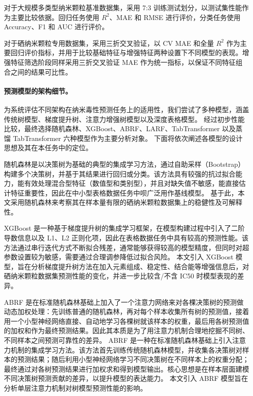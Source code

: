 对于大规模多类型纳米颗粒基准数据集，采用 7:3 训练测试划分，以测试集性能作为主要比较依据。回归任务使用 $R^2$、MAE 和 RMSE 进行评价，分类任务使用 Accuracy、F1 和 AUC 进行评价。

对于硒纳米颗粒专用数据集，采用三折交叉验证，以 CV MAE 和全量 $R^2$ 作为主要回归评价指标，并用于比较基础特征与增强特征两种设置下不同模型的表现。增强特征筛选阶段同样采用三折交叉验证 MAE 作为统一指标，以保证不同特征组合之间的结果可比性。

\paragraph{预测模型的架构细节。}
为系统评估不同架构在纳米毒性预测任务上的适用性，我们尝试了多种模型，涵盖传统树模型、梯度提升树、注意力增强树模型以及深度表格模型。
经过初步性能比较，最终选择随机森林、XGBoost、ABRF、LARF、TabTransformer 以及蒸馏 TabTransformer 六种模型作为主要分析对象。
下面将依次阐述各模型的设计思想及其在本任务中的定位。

随机森林是以决策树为基础的典型的集成学习方法，通过自助采样（Bootstrap）构建多个决策树，并基于其结果进行回归或分类。该方法具有较强的抗过拟合能力，能有效处理混合型特征（数值型和类别型），并且对缺失值不敏感，能直接估计特征重要性，因此在中小型表格数据任务中呗广泛用作基线模型。
基于此，本文采用随机森林来考察其在样本量有限的硒纳米颗粒数据集上的稳健性及可解释性。


XGBoost 是一种基于梯度提升树的集成学习框架，在模型构建过程中引入了二阶导数信息以及 L1、L2 正则化项，因此在表格数据任务中具有较高的预测性能。该方法通过串行迭代方式不断拟合残差，通常能够获得较高的模型精度，但同时对超参数设置较为敏感，需要通过合理调参降低过拟合风险。
本文引入 XGBoost 模型，旨在分析梯度提升树方法在加入元素组成、稳定性、结合能等增强信息后，对硒纳米颗粒数据集预测性能的变化，并进一步比较含/不含 IC50 时模型表现的差异。

ABRF 是在标准随机森林基础上加入了一个注意力网络来对各棵决策树的预测做动态加权处理：先训练普通的随机森林，再对每个样本收集所有树的预测值，接着用一个小型神经网络直接、自动地学习各棵树就该样本的权重，最后用各树预测值的加权和作为最终预测结果。因此其本质是为了用注意力机制合理地挖掘不同树、不同样本之间预测可靠性的差异。
ABRF 是一种在标准随机森林基础上引入注意力机制的集成学习方法。该方法首先训练传统随机森林模型，并收集各决策树对样本的预测结果；随后利用小型神经网络学习不同决策树在不同样本上的权重分配；最终通过对各树预测结果进行加权求和得到模型输出。核心思想是在样本层面建模不同决策树预测贡献的差异，以提升模型的表达能力。
本文引入 ABRF 模型旨在分析单层注意力机制对树模型预测性能的影响。


